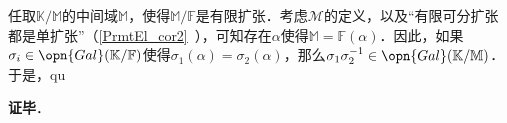 任取$\mathbb{K}/\mathbb{M}$的中间域$\mathbb{M}$，使得$\mathbb{M}/\mathbb{F}$是有限扩张．考虑$\mathcal{M}$的定义，以及“有限可分扩张都是单扩张”（\autoref{PrmtEl_cor2}~），可知存在$\alpha$使得$\mathbb{M}=\mathbb{F}(\alpha)$．因此，如果$\sigma_i\in\opn{Gal}(\mathbb{K}/\mathbb{F})$使得$\sigma_1(\alpha)=\sigma_2(\alpha)$，那么$\sigma_1\sigma_2^{-1}\in\opn{Gal}(\mathbb{K}/\mathbb{M})$．于是，qu

\textbf{证毕}．




































